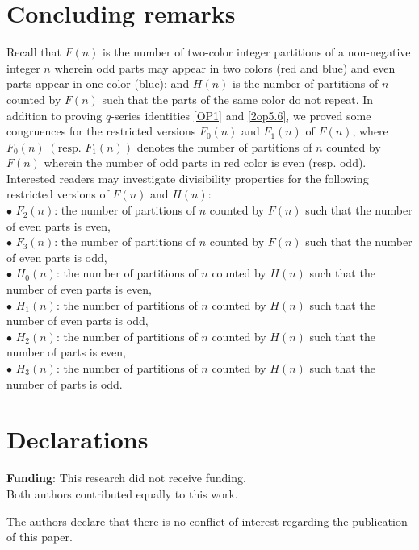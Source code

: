 \documentclass[12pt]{article}
\numberwithin{equation}{section}
\theoremstyle{definition}
\theoremstyle{remark}
\numberwithin{equation}{section}
\begin{document}
\section{Concluding remarks} Recall that $F(n)$ is the number of two-color integer partitions of a non-negative integer $n$ wherein odd parts may appear in two colors (red and blue) and even parts appear in one color (blue); and \( H(n)\) is the number of partitions of \( n \) counted by \(F(n)\) such that the parts of the same color do not repeat.  In addition to  proving $q$-series identities \eqref{OP1} and \eqref{2op5.6}, we proved  some congruences for the restricted versions $F_0(n)$ and $F_1(n)$ of $F(n)$, where $F_0(n)\;(\text{resp. }F_1(n))$ denotes the number of partitions of  $n$ counted by $F(n)$ wherein the number of odd parts in red color is even (resp. odd).
Interested readers may investigate divisibility properties for the following  restricted versions of $F(n)$ and $H(n)$:\\
$\bullet$ $F_2(n)$: the number of partitions of \( n \) counted by \(F(n)\) such that the number of even parts is even,\\
$\bullet$ $F_3(n)$: the number of partitions of \( n \) counted by \(F(n)\) such that the number of even parts is odd,\\
$\bullet$ $H_0(n)$: the number of partitions of \( n \) counted by \(H(n)\) such that the number of even parts is even,\\
$\bullet$ $H_1(n)$: the number of partitions of \( n \) counted by \(H(n)\) such that the number of even parts is odd,\\
$\bullet$ $H_2(n)$: the number of partitions of \( n \) counted by \(H(n)\) such that the number of parts is even,\\
$\bullet$ $H_3(n)$: the number of partitions of \( n \) counted by \(H(n)\) such that the number of parts is odd.

\section*{\bf Declarations}

\noindent\textbf{Funding}: This research did not receive funding.\\
 Both authors contributed equally to this work.
   
 The authors declare that there is no conflict of interest regarding the publication of this paper.
 
\end{document}
